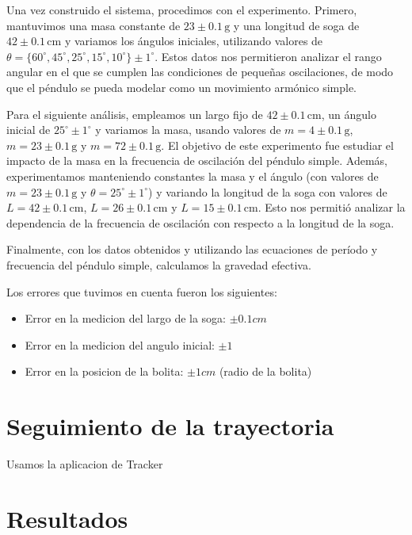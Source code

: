 \documentclass[12pt,a4]{article}
\begin{document}
Una vez construido el sistema, procedimos con el experimento. Primero, mantuvimos una masa constante de $23 \pm 0.1 \, \text{g}$ y una longitud de soga de $42 \pm 0.1 \, \text{cm}$ y variamos los ángulos iniciales, utilizando valores de $\theta = \{60^\circ, 45^\circ, 25^\circ, 15^\circ, 10^\circ\} \pm 1^\circ$. Estos datos nos permitieron analizar el rango angular en el que se cumplen las condiciones de pequeñas oscilaciones, de modo que el péndulo se pueda modelar como un movimiento armónico simple.

Para el siguiente análisis, empleamos un largo fijo de $42 \pm 0.1 \, \text{cm}$, un ángulo inicial de $25^\circ \pm 1^\circ$ y variamos la masa, usando valores de $m = 4 \pm 0.1 \, \text{g}$, $m = 23 \pm 0.1 \, \text{g}$ y $m = 72 \pm 0.1 \, \text{g}$. El objetivo de este experimento fue estudiar el impacto de la masa en la frecuencia de oscilación del péndulo simple. Además, experimentamos manteniendo constantes la masa y el ángulo (con valores de $m = 23 \pm 0.1 \, \text{g}$ y $\theta = 25^\circ \pm 1^\circ$) y variando la longitud de la soga con valores de $L = 42 \pm 0.1 \, \text{cm}$, $L = 26 \pm 0.1 \, \text{cm}$ y $L = 15 \pm 0.1 \, \text{cm}$. Esto nos permitió analizar la dependencia de la frecuencia de oscilación con respecto a la longitud de la soga.

Finalmente, con los datos obtenidos y utilizando las ecuaciones de período y frecuencia del péndulo simple, calculamos la gravedad efectiva.


Los errores que tuvimos en cuenta fueron los siguientes:

\begin{itemize}
    \item Error en la medicion del largo de la soga: $\pm 0.1 cm$
    \item Error en la medicion del angulo inicial: $\pm 1$
    \item Error en la posicion de la bolita: $\pm 1 cm$ (radio de la bolita)
\end{itemize}

\section{Seguimiento de la trayectoria}

Usamos la aplicacion de Tracker %

\section{Resultados}
\end{document}
